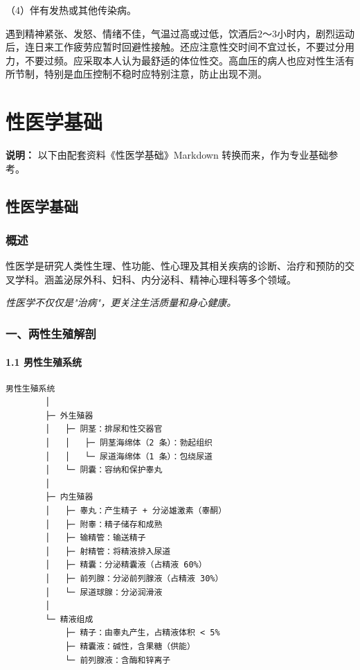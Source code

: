 \documentclass[12pt,UTF8,openany]{ctexbook}
\begin{document}
（4）伴有发热或其他传染病。

遇到精神紧张、发怒、情绪不佳，气温过高或过低，饮酒后2～3小时内，剧烈运动后，连日来工作疲劳应暂时回避性接触。还应注意性交时间不宜过长，不要过分用力，不要过频。应采取本人认为最舒适的体位性交。高血压的病人也应对性生活有所节制，特别是血压控制不稳时应特别注意，防止出现不测。









\clearpage
\part{性医学基础}

\noindent\textbf{说明：} 以下由配套资料《性医学基础》Markdown 转换而来，作为专业基础参考。

\chapter{性医学基础}

\section{概述}

性医学是研究人类性生理、性功能、性心理及其相关疾病的诊断、治疗和预防的交叉学科。涵盖泌尿外科、妇科、内分泌科、精神心理科等多个领域。

\emph{性医学不仅仅是"治病"，更关注生活质量和身心健康。}

\hrulefill

\section{一、两性生殖解剖}

\subsection{1.1 男性生殖系统}

\begin{verbatim}
男性生殖系统
        │
        ├─ 外生殖器
        │   ├─ 阴茎：排尿和性交器官
        │   │   ├─ 阴茎海绵体（2 条）：勃起组织
        │   │   └─ 尿道海绵体（1 条）：包绕尿道
        │   └─ 阴囊：容纳和保护睾丸
        │
        ├─ 内生殖器
        │   ├─ 睾丸：产生精子 + 分泌雄激素（睾酮）
        │   ├─ 附睾：精子储存和成熟
        │   ├─ 输精管：输送精子
        │   ├─ 射精管：将精液排入尿道
        │   ├─ 精囊：分泌精囊液（占精液 60%）
        │   ├─ 前列腺：分泌前列腺液（占精液 30%）
        │   └─ 尿道球腺：分泌润滑液
        │
        └─ 精液组成
            ├─ 精子：由睾丸产生，占精液体积 < 5%
            ├─ 精囊液：碱性，含果糖（供能）
            └─ 前列腺液：含酶和锌离子
\end{verbatim}
\end{document}
